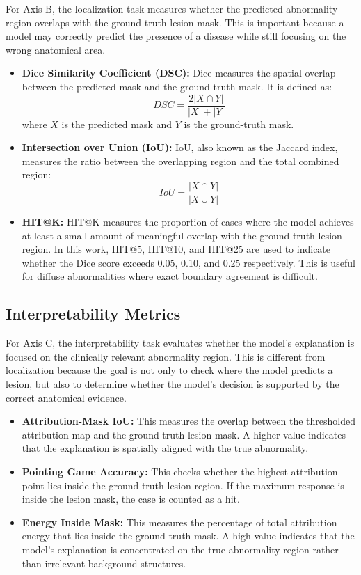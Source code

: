 For Axis B, the localization task measures whether the predicted abnormality region overlaps with the ground-truth lesion mask. This is important because a model may correctly predict the presence of a disease while still focusing on the wrong anatomical area.

\begin{itemize}
    \item \textbf{Dice Similarity Coefficient (DSC):} Dice measures the spatial overlap between the predicted mask and the ground-truth mask. It is defined as:
    \[
    DSC = \frac{2|X \cap Y|}{|X| + |Y|}
    \]
    where \(X\) is the predicted mask and \(Y\) is the ground-truth mask.
    
    \item \textbf{Intersection over Union (IoU):} IoU, also known as the Jaccard index, measures the ratio between the overlapping region and the total combined region:
    \[
    IoU = \frac{|X \cap Y|}{|X \cup Y|}
    \]
    
    \item \textbf{HIT@K:} HIT@K measures the proportion of cases where the model achieves at least a small amount of meaningful overlap with the ground-truth lesion region. In this work, HIT@5, HIT@10, and HIT@25 are used to indicate whether the Dice score exceeds 0.05, 0.10, and 0.25 respectively. This is useful for diffuse abnormalities where exact boundary agreement is difficult.
\end{itemize}

\subsection{Interpretability Metrics}

For Axis C, the interpretability task evaluates whether the model's explanation is focused on the clinically relevant abnormality region. This is different from localization because the goal is not only to check where the model predicts a lesion, but also to determine whether the model's decision is supported by the correct anatomical evidence.

\begin{itemize}
    \item \textbf{Attribution-Mask IoU:} This measures the overlap between the thresholded attribution map and the ground-truth lesion mask. A higher value indicates that the explanation is spatially aligned with the true abnormality.
    
    \item \textbf{Pointing Game Accuracy:} This checks whether the highest-attribution point lies inside the ground-truth lesion region. If the maximum response is inside the lesion mask, the case is counted as a hit.
    
    \item \textbf{Energy Inside Mask:} This measures the percentage of total attribution energy that lies inside the ground-truth mask. A high value indicates that the model's explanation is concentrated on the true abnormality region rather than irrelevant background structures.
\end{itemize}

